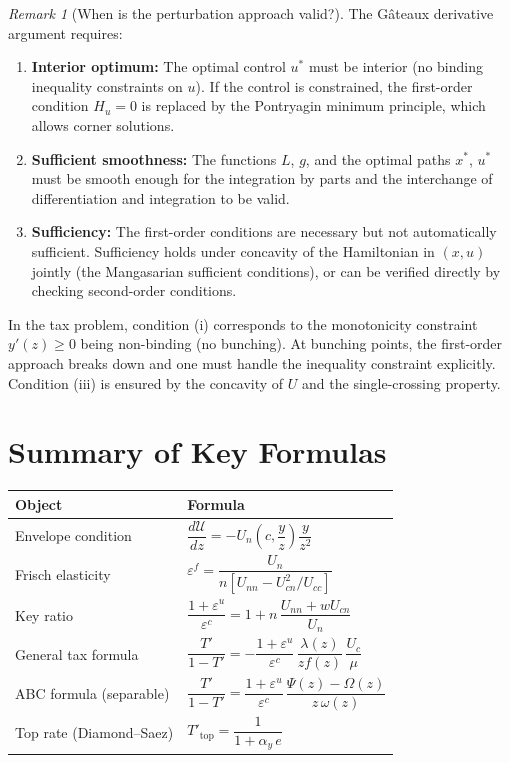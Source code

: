 \documentclass[12pt,a4paper]{article}
\theoremstyle{definition}
\theoremstyle{plain}
\theoremstyle{remark}
\newtheorem{remark}{Remark}[section]
\newcommand{\calU}{\mathcal{U}}
\begin{document}
\begin{remark}[When is the perturbation approach valid?]
\label{rem:perturbation_validity}
The Gâteaux derivative argument requires:
\begin{enumerate}[label=(\roman*)]
  \item \textbf{Interior optimum:} The optimal control $u^*$ must be interior (no binding inequality constraints on $u$). If the control is constrained, the first-order condition $H_u = 0$ is replaced by the Pontryagin minimum principle, which allows corner solutions.
  \item \textbf{Sufficient smoothness:} The functions $L$, $g$, and the optimal paths $x^*$, $u^*$ must be smooth enough for the integration by parts and the interchange of differentiation and integration to be valid.
  \item \textbf{Sufficiency:} The first-order conditions are necessary but not automatically sufficient. Sufficiency holds under concavity of the Hamiltonian in $(x, u)$ jointly (the Mangasarian sufficient conditions), or can be verified directly by checking second-order conditions.
\end{enumerate}
In the tax problem, condition (i) corresponds to the monotonicity constraint $y'(z) \geq 0$ being non-binding (no bunching). At bunching points, the first-order approach breaks down and one must handle the inequality constraint explicitly. Condition (iii) is ensured by the concavity of $U$ and the single-crossing property.
\end{remark}

\section{Summary of Key Formulas}
\label{app:formulas}

\begin{center}
\renewcommand{\arraystretch}{1.8}
\begin{tabular}{lp{8.5cm}}
\hline\hline
\textbf{Object} & \textbf{Formula} \\
\hline
Envelope condition & $\dfrac{d\calU}{dz} = -U_n\!\left(c, \dfrac{y}{z}\right)\dfrac{y}{z^2}$ \\[8pt]
Frisch elasticity & $\varepsilon^f = \dfrac{U_n}{n\left[U_{nn} - U_{cn}^2/U_{cc}\right]}$ \\[8pt]
Key ratio & $\dfrac{1+\varepsilon^u}{\varepsilon^c} = 1 + n\,\dfrac{U_{nn}+wU_{cn}}{U_n}$ \\[8pt]
General tax formula & $\dfrac{T'}{1-T'} = -\dfrac{1+\varepsilon^u}{\varepsilon^c}\,\dfrac{\lambda(z)}{zf(z)}\,\dfrac{U_c}{\mu}$ \\[8pt]
ABC formula (separable) & $\dfrac{T'}{1-T'} = \dfrac{1+\varepsilon^u}{\varepsilon^c}\,\dfrac{\Psi(z)-\Omega(z)}{z\,\omega(z)}$ \\[8pt]
Top rate (Diamond--Saez) & $T'_{\text{top}} = \dfrac{1}{1+\alpha_y \, e}$ \\[6pt]
\hline\hline
\end{tabular}
\end{center}
\end{document}

